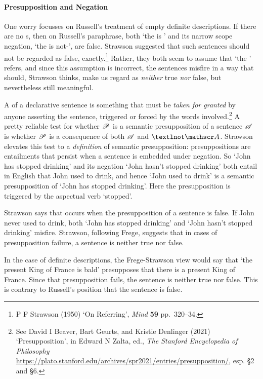 \paragraph{Presupposition and Negation}
One worry focusses on Russell's treatment of empty definite descriptions. If there are no s, then on Russell's paraphrase, both `the  is ' and its narrow scope negation, `the  is not-', are false. Strawson suggested that such sentences should not be regarded as false, exactly.\footnote{P F Strawson (1950) `On Referring', \emph{Mind} \textbf{59} pp.\ 320–34.} Rather, they both seem to assume that `the ' refers, and since this assumption is incorrect, the sentences misfire in a way that should, Strawson thinks, make us regard as \emph{neither} true \emph{nor} false, but nevertheless still meaningful.

A  of a declarative sentence is something that must be \emph{taken for granted} by anyone asserting the sentence, triggered or forced by the words involved.\footnote{See David I Beaver, Bart Geurts, and Kristie Denlinger (2021) `Presupposition', in Edward N Zalta, ed., \emph{The Stanford Encyclopedia of Philosophy} \url{https://plato.stanford.edu/archives/spr2021/entries/presupposition/}, esp. §2 and §6.} A pretty reliable test for whether $\mathscr{P}$ is a semantic presupposition of a sentence $\mathscr{A}$ is whether $\mathscr{P}$ is a consequence of both $\mathscr{A}$ and $¬\meta{A}$. Strawson elevates this test to a \emph{definition} of semantic presupposition: presuppositions are entailments that persist when a sentence is embedded under negation.  So `John has stopped drinking' and its negation `John hasn't stopped drinking' both entail in English that John used to drink, and hence `John used to drink' is a semantic presupposition of `John has stopped drinking'. Here the presupposition is triggered by the aspectual verb `stopped'. 

Strawson says that  occurs when the presupposition of a sentence is false. If John never used to drink, both `John has stopped drinking' and `John hasn't stopped drinking' misfire. Strawson, following Frege, suggests that in cases of presupposition failure, a sentence is neither true nor false. 

In the case of definite descriptions, the Frege-Strawson view would say that `the present King of France is bald' presupposes that there is a present King of France. Since that presupposition fails, the sentence is neither true nor false. This is contrary to Russell's position that the sentence is false. 

